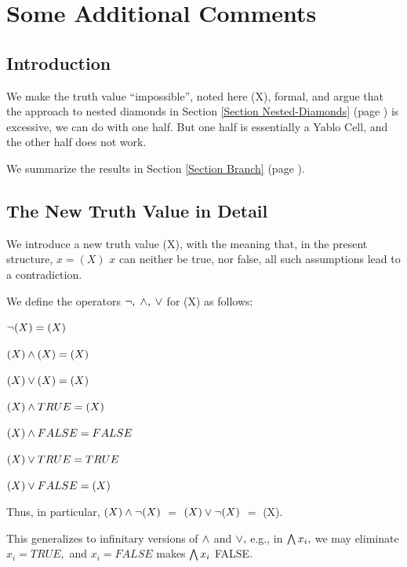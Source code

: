 \vspace{10mm}



\clearpage




\clearpage
\section{
Some Additional Comments
}


\label{Section Additional}
\subsection{
Introduction
}


\ee


We make the truth value ``impossible'', noted here (X), formal, and
argue that the approach to nested diamonds
in Section 
\ref{Section Nested-Diamonds} (page 
\pageref{Section Nested-Diamonds})
is excessive, we can do with one half. But one half is essentially a Yablo
Cell,
and the other half does not work.

We summarize the results in
Section \ref{Section Branch} (page \pageref{Section Branch}).
\subsection{
The New Truth Value in Detail
}


We introduce a new truth value (X), with the meaning that, in the present
structure, $x=(X)$ $x$ can neither be true, nor false, all such
assumptions lead to a contradiction.

We define the operators $ \neg,$ $ \wedge,$ $ \vee $ for (X) as follows:

$ \neg (X)=(X)$

$(X) \wedge (X)=(X)$

$(X) \vee (X)=(X)$

$(X) \wedge TRUE=(X)$

$(X) \wedge FALSE=FALSE$

$(X) \vee TRUE=TRUE$

$(X) \vee FALSE=(X)$

Thus, in particular, $(X) \wedge \neg (X)$ $=$ $(X) \vee \neg (X)$ $=$ (X).

This generalizes to infinitary versions of $ \wedge $ and $ \vee,$ e.g., in
$ \bigwedge x_{i},$
we may eliminate $x_{i}=TRUE,$ and $x_{i}=FALSE$ makes $ \bigwedge x_{i}$
FALSE.
